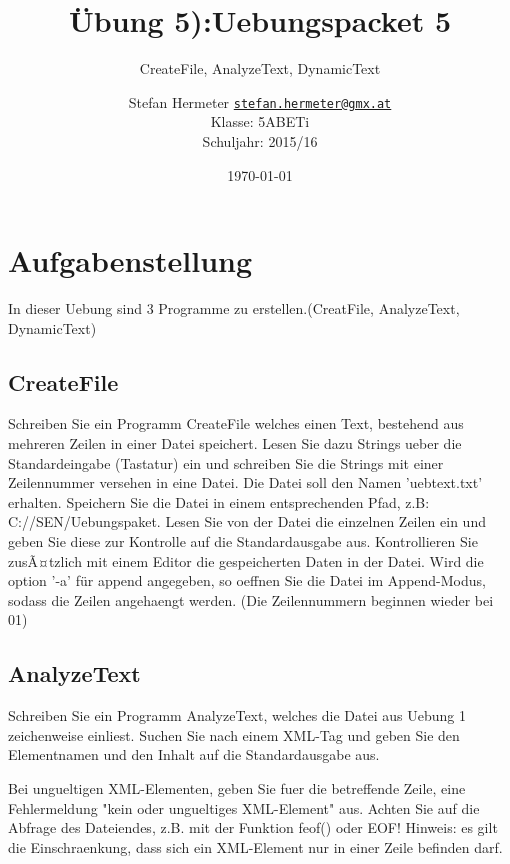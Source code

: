 \documentclass{scrartcl}
\newcommand{\mytitle}{Übung 5)}
\begin{document}
\title{\mytitle:Uebungspacket 5}
\subtitle{CreateFile, AnalyzeText, DynamicText}
\date{\today}
\author{Stefan Hermeter \texttt{\href{mailto:stefan.hermeter@gmx.at}{stefan.hermeter@gmx.at}}\\
  Klasse: 5ABETi\\
  Schuljahr: 2015/16}
\maketitle
{}
\newpage
\tableofcontents
\listoffigures
\newpage
{}
\section{Aufgabenstellung}
In dieser Uebung sind 3 Programme zu erstellen.(CreatFile, AnalyzeText, DynamicText)
\subsection{CreateFile}
Schreiben Sie ein Programm CreateFile welches einen Text, bestehend aus mehreren Zeilen in einer Datei speichert. Lesen Sie dazu Strings ueber die Standardeingabe (Tastatur) ein und schreiben Sie die Strings mit einer
Zeilennummer versehen in eine Datei. Die Datei soll den Namen 'uebtext.txt' erhalten. Speichern Sie die Datei in einem entsprechenden Pfad, z.B: C://SEN/Uebungspaket. Lesen Sie von der Datei die einzelnen Zeilen ein und geben Sie diese zur Kontrolle auf die Standardausgabe aus. Kontrollieren Sie zusÃ¤tzlich mit einem Editor die gespeicherten Daten in der Datei. Wird die option '-a' für append angegeben, so oeffnen Sie die Datei im Append-Modus, sodass die Zeilen angehaengt werden. (Die Zeilennummern beginnen wieder bei 01)
\subsection{AnalyzeText}
Schreiben Sie ein Programm AnalyzeText, welches die Datei aus Uebung 1 zeichenweise einliest. Suchen Sie nach einem XML-Tag und geben Sie den Elementnamen und den Inhalt auf die Standardausgabe aus.

Bei ungueltigen XML-Elementen, geben Sie fuer die betreffende Zeile, eine Fehlermeldung "kein oder ungueltiges XML-Element" aus. Achten Sie auf die Abfrage des Dateiendes, z.B. mit der Funktion feof() oder EOF! Hinweis: es gilt die Einschraenkung, dass sich ein XML-Element nur in einer Zeile befinden darf.
\end{document}
